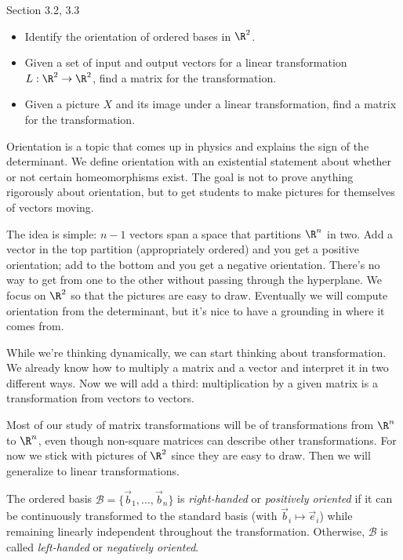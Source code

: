 \documentclass{problemset}
\begin{document}
\begin{lesson}

	Section 3.2, 3.3

	\begin{itemize}
		\item Identify the orientation of ordered bases in $\R^2$.
		\item Given a set of input and output vectors for a
			linear transformation $L:\R^2\to\R^2$, find
			a matrix for the transformation.
		\item Given a picture $X$ and its image under a linear transformation,
			find a matrix for the transformation.
	\end{itemize}

	Orientation is a topic that comes up in physics and explains the sign
	of the determinant. We define orientation with an existential statement
	about whether or not certain homeomorphisms exist. The goal is not to
	prove anything rigorously about orientation, but to get students to
	make pictures for themselves of vectors moving.

	The idea is simple: $n-1$ vectors span a space that partitions $\R^n$ in
	two. Add a vector in the top partition (appropriately ordered) and you get
	a positive orientation; add to the bottom and you get a negative orientation.
	There's no way to get from one to the other without passing through the
	hyperplane. We focus on $\R^2$ so that the pictures are easy to draw.
	Eventually we will compute orientation from the determinant, but it's nice
	to have a grounding in where it comes from.

	While we're thinking dynamically, we can start thinking about transformation.
	We already know how to multiply a matrix and a vector and interpret it in
	two different ways. Now we will add a third: multiplication by a given
	matrix is a transformation from vectors to vectors.

	Most of our study of matrix transformations will be of transformations from $\R^n$
	to $\R^n$, even though non-square matrices can describe other transformations.
	For now we stick with pictures of $\R^2$ since they are easy to draw. Then
	we will generalize to linear transformations.

\end{lesson}

	\begin{definition}
		The ordered basis $\mathcal B=\{\vec b_1,\ldots,\vec b_n\}$ is \emph{right-handed}
		or \emph{positively oriented} if it can be continuously transformed to
		the standard basis (with $\vec b_i\mapsto \vec e_i$) while remaining
		linearly independent throughout the transformation. Otherwise, $\mathcal B$
		is called \emph{left-handed} or \emph{negatively oriented}.
	\end{definition}
\end{document}
